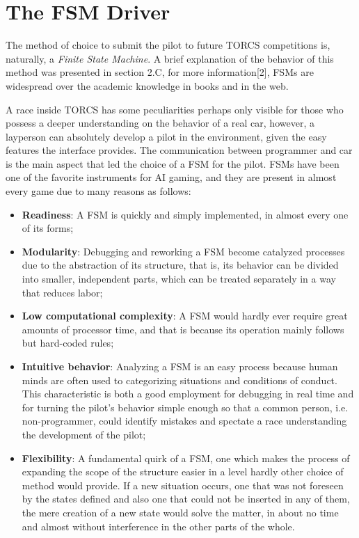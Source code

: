 \section{The FSM Driver}

	The method of choice to submit the pilot to future TORCS competitions is, naturally, a \emph{Finite State Machine}.
	A brief explanation of the behavior of this method was presented in section 2.C, for more information[2], FSMs are
	widespread over the academic knowledge in books and in the web.
	
	A race inside TORCS has some peculiarities perhaps only visible for those who possess a deeper understanding on the
	behavior of a real car, however, a layperson can absolutely develop a pilot in the environment, given the easy 
	features the interface provides. The communication between programmer and car is the main aspect that led the choice
	of a FSM for the pilot. FSMs have been one of the favorite instruments for AI gaming, and they are present in almost
	every game due to many reasons as follows:

\begin{itemize}
	\item \textbf{Readiness}: A FSM is quickly and simply implemented, in almost every one of its forms;
	
	\item \textbf{Modularity}: Debugging and reworking a FSM become catalyzed processes due to the abstraction of its
	structure, that is, its behavior can be divided into smaller, independent parts, which can be treated separately
	in a way that reduces labor;
	
	\item \textbf{Low computational complexity}: A FSM would hardly ever require great amounts of processor time, and
	that is because its operation mainly follows but hard-coded rules;
	
	\item \textbf{Intuitive behavior}: Analyzing a FSM is an easy process because human minds are often used to
	categorizing situations and conditions of conduct. This characteristic is both a good employment for debugging in
	real time and for turning the pilot's behavior simple enough so that a common person, i.e. non-programmer, could
	identify mistakes and spectate a race understanding the development of the pilot;
	
	\item \textbf{Flexibility}: A fundamental quirk of a FSM, one which makes the process of expanding the scope of the
	structure easier in a level hardly other choice of method would provide. If a new situation occurs, one that was
	not foreseen by the states defined and also one that could not be inserted in any of them, the mere creation of a
	new state would solve the matter, in about no time and almost without interference in the other parts of the whole.
\end{itemize}

